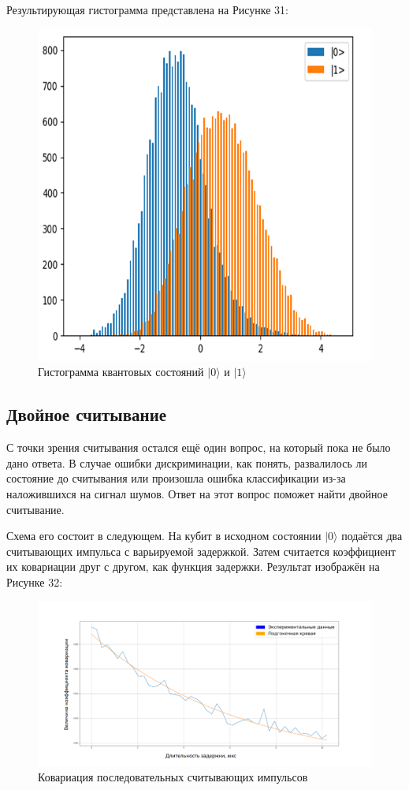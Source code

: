 Результирующая гистограмма представлена на Рисунке 31:

\begin{figure}[h]
	\centering
	\includegraphics[width=0.5\linewidth]{pictures/resulthist}
	\caption{Гистограмма квантовых состояний $|0\rangle$ и $|1\rangle$}
	\label{fig:resulthist}
\end{figure}
\clearpage
\subsection{Двойное считывание}\label{doubleread}
С точки зрения считывания остался ещё один вопрос, на который пока не было дано ответа. В случае ошибки дискриминации, как понять, развалилось ли состояние до считывания или произошла ошибка классификации из-за наложившихся на сигнал шумов. Ответ на этот вопрос поможет найти двойное считывание.

Схема его состоит в следующем. На кубит в исходном состоянии $|0\rangle$ подаётся два считывающих импульса с варьируемой задержкой. Затем считается коэффициент их ковариации друг с другом, как функция задержки. Результат изображён на Рисунке 32:

\begin{figure}[h]
	\centering
	\includegraphics[width=0.8\linewidth]{pictures/result}
	\caption{Ковариация последовательных считывающих импульсов }
	\label{fig:result}
\end{figure}

